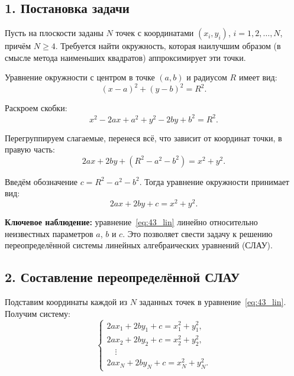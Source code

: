 \documentclass{article}
\begin{document}
\subsection*{1. Постановка задачи}

Пусть на плоскости заданы $N$ точек с координатами $(x_i, y_i)$, $i = 1, 2, \ldots, N$, причём $N \geqslant 4$. Требуется найти окружность, которая наилучшим образом (в смысле метода наименьших квадратов) аппроксимирует эти точки.

Уравнение окружности с центром в точке $(a, b)$ и радиусом $R$ имеет вид:
\begin{equation}
(x - a)^2 + (y - b)^2 = R^2.
\end{equation}

Раскроем скобки:
\begin{equation}
x^2 - 2ax + a^2 + y^2 - 2by + b^2 = R^2.
\end{equation}

Перегруппируем слагаемые, перенеся всё, что зависит от координат точки, в правую часть:
\begin{equation}
2ax + 2by + (R^2 - a^2 - b^2) = x^2 + y^2.
\end{equation}

Введём обозначение $c = R^2 - a^2 - b^2$. Тогда уравнение окружности принимает вид:
\begin{equation}
2ax + 2by + c = x^2 + y^2.
\label{eq:43_lin}
\end{equation}

\textbf{Ключевое наблюдение:} уравнение~\eqref{eq:43_lin} линейно относительно неизвестных параметров $a$, $b$ и $c$. Это позволяет свести задачу к решению переопределённой системы линейных алгебраических уравнений (СЛАУ).

\subsection*{2. Составление переопределённой СЛАУ}

Подставим координаты каждой из $N$ заданных точек в уравнение~\eqref{eq:43_lin}. Получим систему:
\begin{equation}
\begin{cases}
2a x_1 + 2b y_1 + c = x_1^2 + y_1^2, \\
2a x_2 + 2b y_2 + c = x_2^2 + y_2^2, \\
\quad \vdots \\
2a x_N + 2b y_N + c = x_N^2 + y_N^2.
\end{cases}
\end{equation}
\end{document}
